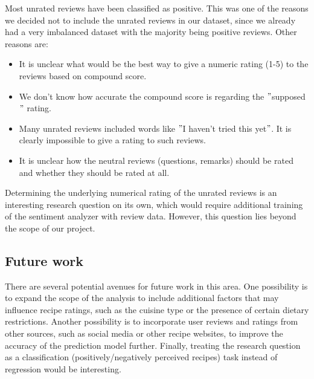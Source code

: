 \documentclass{article}
\begin{document}

Most unrated reviews have been classified as positive. This was one of the reasons we decided not to include the unrated reviews in our dataset, since we already had a very imbalanced dataset with the majority being positive reviews. Other reasons are:
\begin{itemize}[noitemsep,topsep=5pt]
    \item It is unclear what would be the best way to give a numeric rating (1-5) to the reviews based on compound score.
    \item We don't know how accurate the compound score is regarding the $"$supposed$"$ rating.
    \item Many unrated reviews included words like $"$I haven't tried this yet$"$. It is clearly impossible to give a rating to such reviews.
    \item It is unclear how the neutral reviews (questions, remarks) should be rated and whether they should be rated at all.
\end{itemize}
Determining the underlying numerical rating of the unrated reviews is an interesting research question on its own, which would require additional training of the sentiment analyzer with review data. However, this question lies beyond the scope of our project. 



\subsection{Future work}
\label{Future work}
There are several potential avenues for future work in this area. One possibility is to expand the scope of the analysis to include additional factors that may influence recipe ratings, such as the cuisine type or the presence of certain dietary restrictions. Another possibility is to incorporate user reviews and ratings from other sources, such as social media or other recipe websites, to improve the accuracy of the prediction model further. Finally, treating the research question as a classification (positively/negatively perceived recipes) task instead of regression would be interesting. %



\end{document}
